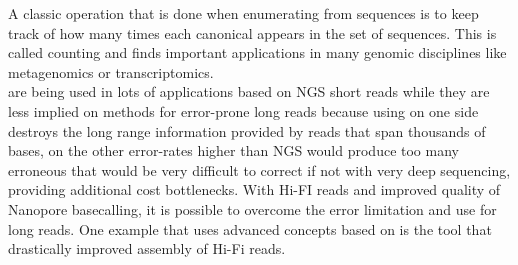 A classic operation that is done when enumerating \kmers from sequences is to keep track of how many times each canonical \kmer appears in the set of sequences. This is called \kmer counting and finds important applications in many genomic disciplines like metagenomics or transcriptomics.\\
\kmers are being used in lots of applications based on NGS short reads while they are less implied on methods for error-prone long reads because using \kmers on one side destroys the long range information provided by reads that span thousands of bases, on the other error-rates higher than NGS would produce too many erroneous \kmers that would be very difficult to correct if not with very deep sequencing, providing additional cost bottlenecks. With Hi-FI reads and improved quality of Nanopore basecalling, it is possible to overcome the error limitation and use \kmers for long reads. One example that uses advanced concepts based on \kmers is the tool \mdbg that drastically improved assembly of Hi-Fi reads.\\ 

